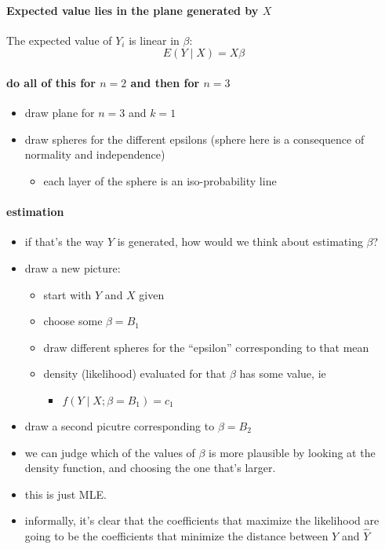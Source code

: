 \paragraph{Expected value lies in the plane generated by $X$}
      The expected value of $Y_i$ is linear in $\beta$:
      \[ E(Y \mid X) = X\beta \]

\paragraph{do all of this for $n=2$ and then for $n = 3$}
\begin{itemize}
\item draw plane for $n = 3$ and $k = 1$
\item draw spheres for the different epsilons (sphere here is a
         consequence of normality and independence)
\begin{itemize}
\item each layer of the sphere is an iso-probability line
\end{itemize}
\end{itemize}

\paragraph{estimation}
\begin{itemize}
\item if that's the way $Y$ is generated, how would we think about
        estimating $\beta$?
\item draw a new picture:
\begin{itemize}
\item start with $Y$ and $X$ given
\item choose some $\beta = B_1$
\item draw different spheres for the ``epsilon'' corresponding to that mean
\item density (likelihood) evaluated for that $\beta$ has some value, ie
\begin{itemize}
\item $f(Y \mid X; \beta = B_1) = c_1$
\end{itemize}
\end{itemize}
\item draw a second picutre corresponding to $\beta = B_2$
\item we can judge which of the values of $\beta$ is more plausible by
        looking at the density function, and choosing the one that's larger.
\item this is just MLE.
\item informally, it's clear that the coefficients that maximize the
        likelihood are going to be the coefficients that minimize the
        distance between $Y$ and $\hat Y$
\end{itemize}

